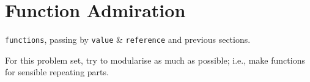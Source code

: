 \section{Function Admiration}
\begin{topics}
\verb!functions!, passing by \verb!value! \& \verb!reference! and previous sections.
\end{topics}
For this problem set, try to modularise as much as possible; i.e., make functions for sensible repeating parts.




